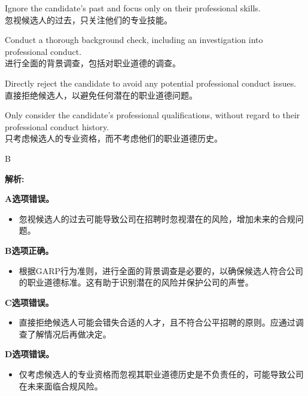 \documentclass{article}
\newenvironment{explanation}
{\textbf{解析:}\par}
{\par}
\begin{document}
            \begin{choices}
                \item Ignore the candidate's past and focus only on their professional skills.\\
                忽视候选人的过去，只关注他们的专业技能。
                \item Conduct a thorough background check, including an investigation into professional conduct.\\
                进行全面的背景调查，包括对职业道德的调查。
                \item Directly reject the candidate to avoid any potential professional conduct issues.\\
                直接拒绝候选人，以避免任何潜在的职业道德问题。
                \item Only consider the candidate's professional qualifications, without regard to their professional conduct history.\\
                只考虑候选人的专业资格，而不考虑他们的职业道德历史。
            \end{choices}
            
            \begin{correctanswer}
            B
            \end{correctanswer}
            
            \begin{explanation}
                \textbf{A选项错误。}
                \begin{itemize}
                    \item 忽视候选人的过去可能导致公司在招聘时忽视潜在的风险，增加未来的合规问题。
                \end{itemize}
            
                \textbf{B选项正确。}
                \begin{itemize}
                    \item 根据GARP行为准则，进行全面的背景调查是必要的，以确保候选人符合公司的职业道德标准。这有助于识别潜在的风险并保护公司的声誉。
                \end{itemize}
            
                \textbf{C选项错误。}
                \begin{itemize}
                    \item 直接拒绝候选人可能会错失合适的人才，且不符合公平招聘的原则。应通过调查了解情况后再做决定。
                \end{itemize}
            
                \textbf{D选项错误。}
                \begin{itemize}
                    \item 仅考虑候选人的专业资格而忽视其职业道德历史是不负责任的，可能导致公司在未来面临合规风险。
                \end{itemize}
            \end{explanation}
            
\end{document}
